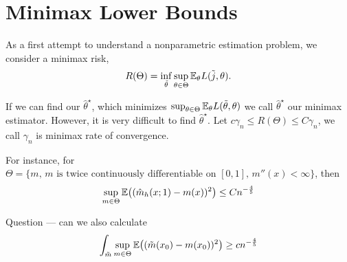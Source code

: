 
\chapter{Minimax Lower Bounds}
\label{cha:minimax-lower-bounds}

As a first attempt to understand a nonparametric estimation problem,
we consider a minimax risk,
\begin{equation}
  \label{eq:105}
  R(\Theta) = \inf_{\tilde \theta} \sup_{\theta \in \Theta}
  \E_{\theta} L(\tilde j, \theta).
\end{equation}

If we can find our $\hat \theta^{\star}$, which minimizes
$\sup_{\theta \in \Theta} \E_{\theta} L(\tilde \theta, \theta)$ we
call $\hat \theta^{\star}$ our minimax estimator. However, it is very
difficult to find $\hat \theta^{\star}$. Let $c \gamma_{n} \leq
R(\Theta) \leq C \gamma_{n}$, we call $\gamma_{n}$ is minimax rate of
convergence.

For instance, for $\Theta = \{ \text{$m$, $m$ is twice continuously
  differentiable on $[0, 1]$, $m''(x) < \infty$} \}$, then
\begin{equation}
  \label{eq:106}
  \sup_{m \in \Theta} \E{(\hat m_{h}(x; 1) - m(x))^{2}} \leq C n^{-\frac{4}{5}}
\end{equation}

Question --- can we also calculate
\begin{equation}
  \label{eq:107}
  \int_{\tilde m} \sup_{m \in \Theta} \E{(\tilde m(x_{0}) - m(x_{0}))^{2}} \geq cn^{-\frac{4}{5}}
\end{equation}

